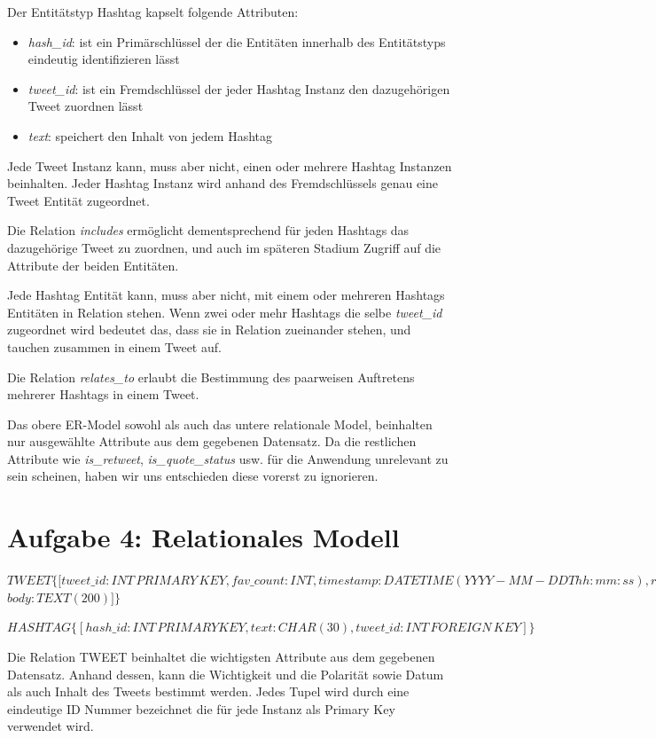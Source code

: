 \documentclass[12pt]{article}
\begin{document}
Der Entitätstyp Hashtag kapselt folgende Attributen:
\begin{itemize}
\item \textit{hash\_id}: ist ein Primärschlüssel der die Entitäten innerhalb des Entitätstyps eindeutig identifizieren lässt
\item \textit{tweet\_id}: ist ein Fremdschlüssel der jeder Hashtag Instanz den dazugehörigen Tweet zuordnen lässt
\item \textit{text}: speichert den Inhalt von jedem Hashtag
\end{itemize}

Jede Tweet Instanz kann, muss aber nicht, einen oder mehrere Hashtag Instanzen beinhalten. Jeder Hashtag Instanz wird anhand des Fremdschlüssels genau eine Tweet Entität zugeordnet.

Die Relation \textit{includes} ermöglicht dementsprechend für jeden Hashtags das dazugehörige Tweet zu zuordnen, und auch im späteren Stadium Zugriff auf die Attribute der beiden Entitäten.

Jede Hashtag Entität kann, muss aber nicht, mit einem oder mehreren Hashtags Entitäten in Relation stehen. Wenn zwei oder mehr Hashtags die selbe \textit{tweet\_id} zugeordnet wird bedeutet das, dass sie in Relation zueinander stehen, und tauchen zusammen in einem Tweet auf.

Die Relation \textit{relates\_to} erlaubt die Bestimmung des paarweisen Auftretens mehrerer Hashtags in einem Tweet.

Das obere ER-Model sowohl als auch das untere relationale Model, beinhalten nur ausgewählte Attribute aus dem gegebenen Datensatz.
Da die restlichen Attribute wie \textit{is\_retweet}, \textit{is\_quote\_status} usw. für die Anwendung unrelevant zu sein scheinen, haben wir uns entschieden diese vorerst zu ignorieren.

\newpage

\section*{Aufgabe 4: Relationales Modell}
$TWEET \{[tweet\_id:INT\, PRIMARY\, KEY, fav\_count:INT, timestamp:DATETIME(YYYY-MM-DDThh:mm:ss), retweet\_count:INT,$ 
$ body:TEXT(200)] \}$

$HASHTAG\{[hash\_id:INT\, PRIMARY KEY, text:CHAR(30), tweet\_id:INT\, FOREIGN\, KEY]\} $
     


Die Relation TWEET beinhaltet die wichtigsten Attribute aus dem gegebenen Datensatz. Anhand dessen, kann die Wichtigkeit und die Polarität sowie Datum als auch Inhalt des Tweets bestimmt werden.
Jedes Tupel wird durch eine eindeutige ID Nummer bezeichnet die für jede Instanz als Primary Key verwendet wird.
\end{document}
